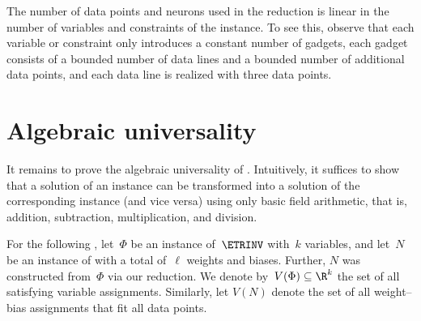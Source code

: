 
\begin{remark}
    The number of data points and neurons used in the reduction is linear in the number of variables and constraints of the \ETRINV instance.
    To see this, observe that each variable or constraint only introduces a constant number of gadgets, each gadget consists of %
%
a bounded number of %
data lines and %
a bounded number of %
additional data points, and each data line is realized with three data points.
\end{remark}

\section{Algebraic universality}
\label{sec:universality}

It remains to prove the algebraic universality of \trainNN.
Intuitively, it suffices to show that a solution of an \ETRINV instance can be transformed into a solution of the corresponding \trainNN instance (and vice versa) using only basic field arithmetic, that is, addition, subtraction, multiplication, and division.

For the following , let~$\Phi$ be an instance of~$\ETRINV$ with~$k$ variables, and let~$N$ be an instance of \trainNN with a total of~$\ell$ weights and biases.
Further, $N$ was constructed from~$\Phi$ via our reduction.
We denote by~$V(\Phi) \subseteq \R^k$ the set of all satisfying variable assignments.
Similarly, %
%
let $V(N)$ denote the set of all 
%
weight--bias assignments  %
that fit all data points.


